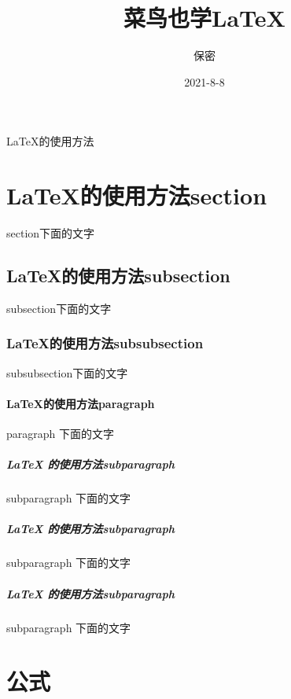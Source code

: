 \documentclass[utf-8,a4paper,11pt]{article}
\title{菜鸟也学\LaTeX}
\author{保密}
\date{2021-8-8}
\begin{document}
\maketitle


\LaTeX 的使用方法

\section{LaTeX的使用方法section}
section下面的文字
\subsection{LaTeX的使用方法subsection}
subsection下面的文字
\subsubsection{LaTeX的使用方法subsubsection}
subsubsection下面的文字
\paragraph{\LaTeX{}的使用方法paragraph}
paragraph 下面的文字
\subparagraph{\LaTeX{} 的使用方法subparagraph}
subparagraph 下面的文字
\subparagraph{\LaTeX{} 的使用方法subparagraph}
subparagraph 下面的文字
\subparagraph{\LaTeX{} 的使用方法subparagraph}
subparagraph 下面的文字

\section{公式}
\end{document}
